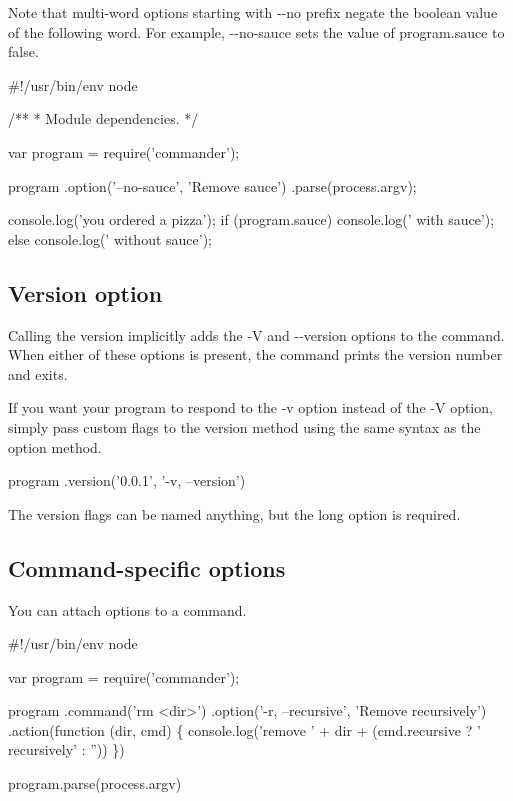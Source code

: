 Note that multi-\/word options starting with {\ttfamily -\/-\/no} prefix negate the boolean value of the following word. For example, {\ttfamily -\/-\/no-\/sauce} sets the value of {\ttfamily program.\+sauce} to false.


\begin{DoxyCode}
#!/usr/bin/env node

/**
 * Module dependencies.
 */

var program = require('commander');

program
  .option('--no-sauce', 'Remove sauce')
  .parse(process.argv);

console.log('you ordered a pizza');
if (program.sauce) console.log('  with sauce');
else console.log(' without sauce');
\end{DoxyCode}


\subsection*{Version option}

Calling the {\ttfamily version} implicitly adds the {\ttfamily -\/V} and {\ttfamily -\/-\/version} options to the command. When either of these options is present, the command prints the version number and exits. 


If you want your program to respond to the {\ttfamily -\/v} option instead of the {\ttfamily -\/V} option, simply pass custom flags to the {\ttfamily version} method using the same syntax as the {\ttfamily option} method.


\begin{DoxyCode}
program
  .version('0.0.1', '-v, --version')
\end{DoxyCode}


The version flags can be named anything, but the long option is required.

\subsection*{Command-\/specific options}

You can attach options to a command.


\begin{DoxyCode}
#!/usr/bin/env node

var program = require('commander');

program
  .command('rm <dir>')
  .option('-r, --recursive', 'Remove recursively')
  .action(function (dir, cmd) \{
    console.log('remove ' + dir + (cmd.recursive ? ' recursively' : ''))
  \})

program.parse(process.argv)
\end{DoxyCode}


